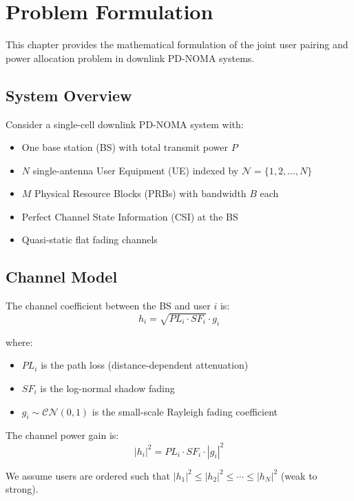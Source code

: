 \chapter{Problem Formulation}
\label{chap:problem}

This chapter provides the mathematical formulation of the joint user pairing and power allocation problem in downlink PD-NOMA systems.

\section{System Overview}

Consider a single-cell downlink PD-NOMA system with:
\begin{itemize}
    \item One base station (BS) with total transmit power $P$
    \item $N$ single-antenna User Equipment (UE) indexed by $\mathcal{N} = \{1, 2, \ldots, N\}$
    \item $M$ Physical Resource Blocks (PRBs) with bandwidth $B$ each
    \item Perfect Channel State Information (CSI) at the BS
    \item Quasi-static flat fading channels
\end{itemize}

\section{Channel Model}

The channel coefficient between the BS and user $i$ is:
\begin{equation}
h_i = \sqrt{PL_i \cdot SF_i} \cdot g_i
\label{eq:channel_gain}
\end{equation}

where:
\begin{itemize}
    \item $PL_i$ is the path loss (distance-dependent attenuation)
    \item $SF_i$ is the log-normal shadow fading
    \item $g_i \sim \mathcal{CN}(0, 1)$ is the small-scale Rayleigh fading coefficient
\end{itemize}

The channel power gain is:
\begin{equation}
|h_i|^2 = PL_i \cdot SF_i \cdot |g_i|^2
\end{equation}

We assume users are ordered such that $|h_1|^2 \leq |h_2|^2 \leq \cdots \leq |h_N|^2$ (weak to strong).

